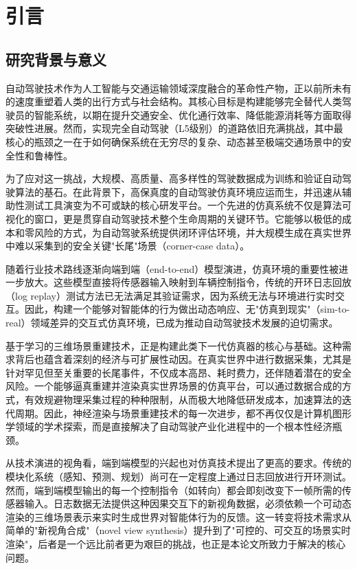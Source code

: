 
\chapter{引言}

\section{研究背景与意义}

自动驾驶技术作为人工智能与交通运输领域深度融合的革命性产物，正以前所未有的速度重塑着人类的出行方式与社会结构。其核心目标是构建能够完全替代人类驾驶员的智能系统，以期在提升交通安全、优化通行效率、降低能源消耗等方面取得突破性进展。然而，实现完全自动驾驶（L5级别）的道路依旧充满挑战，其中最核心的瓶颈之一在于如何确保系统在无穷尽的复杂、动态甚至极端交通场景中的安全性和鲁棒性。

为了应对这一挑战，大规模、高质量、高多样性的驾驶数据成为训练和验证自动驾驶算法的基石。在此背景下，高保真度的自动驾驶仿真环境应运而生，并迅速从辅助性测试工具演变为不可或缺的核心研发平台。一个先进的仿真系统不仅是算法可视化的窗口，更是贯穿自动驾驶技术整个生命周期的关键环节。它能够以极低的成本和零风险的方式，为自动驾驶系统提供闭环评估环境，并大规模生成在真实世界中难以采集到的安全关键"长尾"场景（corner-case data）\cite{chen2025snerf}。

随着行业技术路线逐渐向端到端（end-to-end）模型演进，仿真环境的重要性被进一步放大。这些模型直接将传感器输入映射到车辆控制指令，传统的开环日志回放（log replay）测试方法已无法满足其验证需求，因为系统无法与环境进行实时交互。因此，构建一个能够对智能体的行为做出动态响应、无"仿真到现实"（sim-to-real）领域差异的交互式仿真环境，已成为推动自动驾驶技术发展的迫切需求\cite{lin2024drivinggaussian}。

基于学习的三维场景重建技术，正是构建此类下一代仿真器的核心与基础\cite{tonderski2024neurad}。这种需求背后也蕴含着深刻的经济与可扩展性动因。在真实世界中进行数据采集，尤其是针对罕见但至关重要的长尾事件，不仅成本高昂、耗时费力，还伴随着潜在的安全风险\cite{yan2024street}。一个能够逼真重建并渲染真实世界场景的仿真平台，可以通过数据合成的方式，有效规避物理采集过程的种种限制，从而极大地降低研发成本，加速算法的迭代周期\cite{chen2025snerf}。因此，神经渲染与场景重建技术的每一次进步，都不再仅仅是计算机图形学领域的学术探索，而是直接解决了自动驾驶产业化进程中的一个根本性经济瓶颈。

从技术演进的视角看，端到端模型的兴起也对仿真技术提出了更高的要求。传统的模块化系统（感知、预测、规划）尚可在一定程度上通过日志回放进行开环测试。然而，端到端模型输出的每一个控制指令（如转向）都会即刻改变下一帧所需的传感器输入。日志数据无法提供这种因果交互下的新视角数据，必须依赖一个可动态渲染的三维场景表示来实时生成世界对智能体行为的反馈。这一转变将技术需求从简单的"新视角合成"（novel view synthesis）提升到了"可控的、可交互的场景实时渲染"，后者是一个远比前者更为艰巨的挑战，也正是本论文所致力于解决的核心问题。

